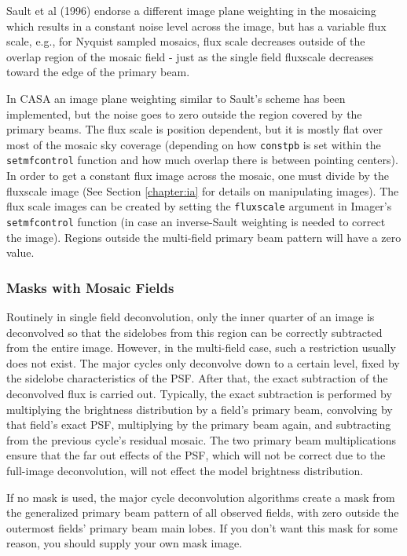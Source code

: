 Sault et al (1996) endorse a different image plane weighting in the
mosaicing which results in a constant noise level across the image, but
has a variable flux scale, e.g., for Nyquist sampled mosaics, flux scale
decreases outside of the overlap region of the mosaic field - just as the
single field fluxscale decreases toward the edge of the primary beam.

In CASA an image plane weighting similar to Sault's scheme has been
implemented, but the noise goes to zero outside the region covered by
the primary beams.  The flux scale is position dependent, but it is
mostly flat over most of the mosaic sky coverage (depending on how
{\tt constpb} is set within the {\tt setmfcontrol} function and how
much overlap there is between pointing centers).  In order to get a
constant flux image across the mosaic, one must divide by the
fluxscale image (See Section \ref{chapter:ia} for details
on manipulating images).  The flux scale images can be created by
setting the {\tt fluxscale} argument in Imager's {\tt setmfcontrol}
function (in case an inverse-Sault weighting is needed to correct the
image). Regions outside the multi-field primary beam pattern will have
a zero value.

\subsubsection{Masks with Mosaic Fields}
\label{section:imtool.mosaic.details.masks}

Routinely in single field deconvolution, only the inner quarter of an
image is deconvolved so that the sidelobes from this region can be
correctly subtracted from the entire image.  However, in the
multi-field case, such a restriction usually does not exist.  The
major cycles only deconvolve down to a certain level, fixed by the
sidelobe characteristics of the PSF.  After that, the exact
subtraction of the deconvolved flux is carried out.  Typically, the
exact subtraction is performed by multiplying the brightness
distribution by a field's primary beam, convolving by that field's
exact PSF, multiplying by the primary beam again, and subtracting from
the previous cycle's residual mosaic.  The two primary beam
multiplications ensure that the far out effects of the PSF, which will
not be correct due to the full-image deconvolution, will not effect
the model brightness distribution.

If no mask is used, the major cycle deconvolution algorithms create a
mask from the generalized primary beam pattern of all observed fields,
with zero outside the outermost fields' primary beam main lobes.  If
you don't want this mask for some reason, you should supply your own
mask image.

